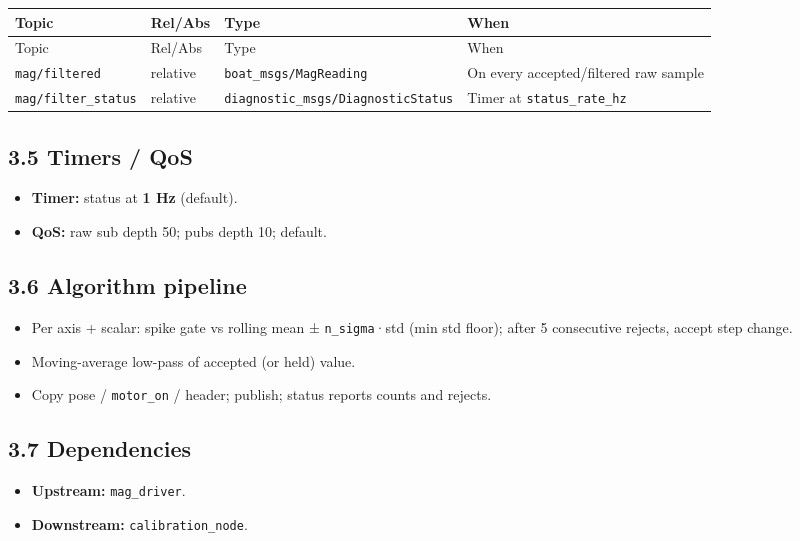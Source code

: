 \begin{center}
\small
\begin{longtable}{@{}lllp{5.2cm}@{}}
\toprule
Topic & Rel/Abs & Type & When \\
\midrule
\endfirsthead
\toprule
Topic & Rel/Abs & Type & When \\
\midrule
\endhead
\texttt{mag/filtered} & relative & \texttt{boat\_msgs/MagReading} & On every accepted/filtered raw sample \\
\texttt{mag/filter\_status} & relative & \texttt{diagnostic\_msgs/DiagnosticStatus} & Timer at \texttt{status\_rate\_hz} \\
\bottomrule
\end{longtable}
\end{center}


\subsection{3.5 Timers / QoS}


\begin{itemize}[leftmargin=*]
\item \textbf{Timer:} status at \textbf{1 Hz} (default).
\item \textbf{QoS:} raw sub depth 50; pubs depth 10; default.
\end{itemize}


\subsection{3.6 Algorithm pipeline}


\begin{itemize}[leftmargin=*]
\item Per axis + scalar: spike gate vs rolling mean ± \texttt{n\_sigma}·std (min std floor); after 5 consecutive rejects, accept step change.
\item Moving-average low-pass of accepted (or held) value.
\item Copy pose / \texttt{motor\_on} / header; publish; status reports counts and rejects.
\end{itemize}


\subsection{3.7 Dependencies}


\begin{itemize}[leftmargin=*]
\item \textbf{Upstream:} \texttt{mag\_driver}.
\item \textbf{Downstream:} \texttt{calibration\_node}.
\end{itemize}




